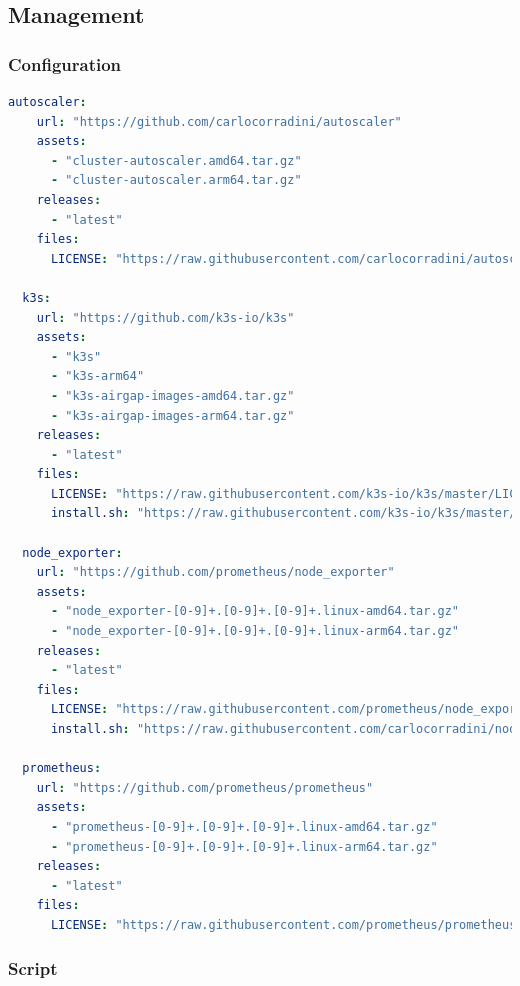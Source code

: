 \subsection{Management}
\label{subsec:implementation_dependencies_management}

\subsubsection{Configuration}
\label{subsec:implementation_dependencies_management_configuration}

\begin{lstlisting}[language=yaml, alsoletter={.}, morekeywords={[2]{autoscaler, k3s, node_exporter, prometheus, url, assets, releases, files, LICENSE, install.sh}}, xleftmargin=\parindent, caption=TODO]
  autoscaler:
    url: "https://github.com/carlocorradini/autoscaler"
    assets:
      - "cluster-autoscaler.amd64.tar.gz"
      - "cluster-autoscaler.arm64.tar.gz"
    releases:
      - "latest"
    files:
      LICENSE: "https://raw.githubusercontent.com/carlocorradini/autoscaler/master/LICENSE"

  k3s:
    url: "https://github.com/k3s-io/k3s"
    assets:
      - "k3s"
      - "k3s-arm64"
      - "k3s-airgap-images-amd64.tar.gz"
      - "k3s-airgap-images-arm64.tar.gz"
    releases:
      - "latest"
    files:
      LICENSE: "https://raw.githubusercontent.com/k3s-io/k3s/master/LICENSE"
      install.sh: "https://raw.githubusercontent.com/k3s-io/k3s/master/install.sh"

  node_exporter:
    url: "https://github.com/prometheus/node_exporter"
    assets:
      - "node_exporter-[0-9]+.[0-9]+.[0-9]+.linux-amd64.tar.gz"
      - "node_exporter-[0-9]+.[0-9]+.[0-9]+.linux-arm64.tar.gz"
    releases:
      - "latest"
    files:
      LICENSE: "https://raw.githubusercontent.com/prometheus/node_exporter/master/LICENSE"
      install.sh: "https://raw.githubusercontent.com/carlocorradini/node_exporter_installer/main/install.sh"

  prometheus:
    url: "https://github.com/prometheus/prometheus"
    assets:
      - "prometheus-[0-9]+.[0-9]+.[0-9]+.linux-amd64.tar.gz"
      - "prometheus-[0-9]+.[0-9]+.[0-9]+.linux-arm64.tar.gz"
    releases:
      - "latest"
    files:
      LICENSE: "https://raw.githubusercontent.com/prometheus/prometheus/main/LICENSE"
\end{lstlisting}

\subsubsection{Script}
\label{subsec:implementation_dependencies_management_script}

